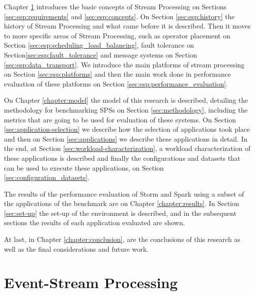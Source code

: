 \documentclass[ppgc,diss,english]{iiufrgs}
\begin{document}
Chapter \ref{chapter:event-stream-processing} introduces the basic concepts of Stream Processing on Sections \ref{sec:esp:requirements} and \ref{sec:esp:concepts}. On Section \ref{sec:esp:history} the history of Stream Processing and what came before it is described. Then it moves to more specific areas of Stream Processing, such as operator placement on Section \ref{sec:esp:scheduling_load_balancing}, fault tolerance on Section\ref{sec:esp:fault_tolerance} and message systems on Section \ref{sec:esp:data_transport}. We introduce the main platforms of stream processing on Section \ref{sec:esp:platforms} and then the main work done in performance evaluation of these platforms on Section \ref{sec:esp:performance_evaluation}.

On Chapter \ref{chapter:model} the model of this research is described, detailing the methodology for benchmarking SPSs on Section \ref{sec:methodology}, including the metrics that are going to be used for evaluation of these systems. On Section \ref{sec:application-selection} we describe how the selection of applications took place and then on Section \ref{sec:applications} we describe these applications in detail. In the end, at Section \ref{sec:workload-characterization}, a workload characterization of these applications is described and finally the configurations and datasets that can be used to execute these applications, on Section \ref{sec:configuration_datasets}.

The results of the performance evaluation of Storm and Spark using a subset of the applications of the benchmark are on Chapter \ref{chapter:results}. In Section \ref{sec:set-up} the set-up of the environment is described, and in the subsequent sections the results of each application evaluated are shown.

At last, in Chapter \ref{chapter:conclusion}, are the conclusions of this research as well as the final considerations and future work.

\chapter{Event-Stream Processing}
\label{chapter:event-stream-processing}
\end{document}
